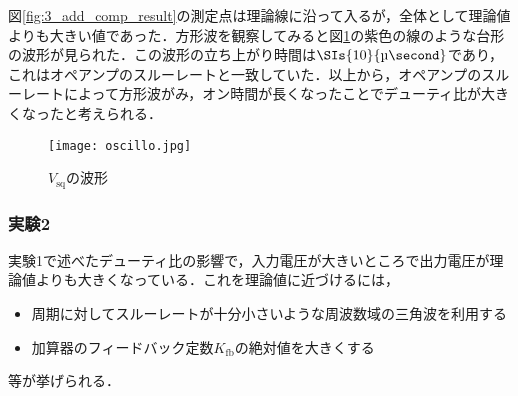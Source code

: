 \documentclass[1_power_supply.tex]{subfiles}
\begin{document}
      図\ref{fig:3_add_comp_result}の測定点は理論線に沿って入るが，全体として理論値よりも大きい値であった．方形波を観察してみると図\ref{fig:oscillo}の紫色の線のような台形の波形が見られた．この波形の立ち上がり時間は$\SIs{10}{\text{\textmu}\second}$であり，これはオペアンプのスルーレートと一致していた．以上から，オペアンプのスルーレートによって方形波がみ，オン時間が長くなったことでデューティ比が大きくなったと考えられる．


      \begin{figure}[htbp]
        \begin{center}
          \texttt{[image: oscillo.jpg]}
          \caption{$V_\mathrm{sq}$の波形}\label{fig:oscillo}
        \end{center}
      \end{figure}

    \subsubsection{実験2}
      実験1で述べたデューティ比の影響で，入力電圧が大きいところで出力電圧が理論値よりも大きくなっている．これを理論値に近づけるには，
      \begin{itemize}
        \item 周期に対してスルーレートが十分小さいような周波数域の三角波を利用する
        \item 加算器のフィードバック定数$K_\mathrm{fb}$の絶対値を大きくする
      \end{itemize}
      等が挙げられる．
\end{document}
